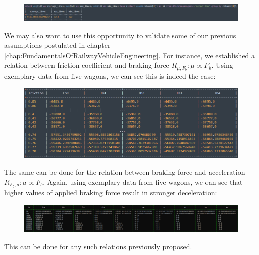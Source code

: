 \begin{figure}[htb!]
	\centering
	\includegraphics[width=\linewidth]{./pic/query_avg_lines}
\end{figure}

We may also want to use this opportunity to validate some of our previous assumptions postulated in chapter \ref{chap:FundamentalsOfRailwayVehicleEngineering}. For instance, we established a relation between friction coefficient and braking force $R_{\mu,F_{b}}:\mu \propto F_{b}$. Using exemplary data from five wagons, we can see this is indeed the case:

\begin{figure}[htb!]
	\centering
	\includegraphics[width=\linewidth]{./pic/query_fc_fb}
\end{figure}

The same can be done for the relation between braking force and acceleration $R_{F_{b},a}:a \propto F_{b}$. Again, using exemplary data from five wagons, we can see that higher values of applied braking force result in stronger deceleration:

\begin{figure}[htb!]
	\centering
	\includegraphics[width=\linewidth]{./pic/query_fb_a}
\end{figure}

This can be done for any such relations previously proposed. 

